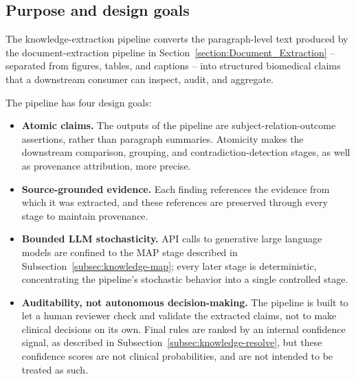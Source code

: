 \subsection{Purpose and design goals}\label{subsec:knowledge-pipeline-purpose}

The knowledge-extraction pipeline converts the paragraph-level text produced by the document-extraction pipeline in Section~\ref{section:Document_Extraction} -- separated from figures, tables, and captions -- into structured biomedical claims that a downstream consumer can inspect, audit, and aggregate. 

\medskip{}

The pipeline has four design goals: 

\begin{itemize}[label={}, leftmargin=1.5em, itemsep=0.4em]

    \item \textbf{Atomic claims.} The outputs of the pipeline are subject-relation-outcome assertions, rather than paragraph summaries. Atomicity makes the downstream comparison, grouping, and contradiction-detection stages, as well as provenance attribution, more precise.
    
    \item \textbf{Source-grounded evidence.} Each finding references the evidence from which it was extracted, and these references are preserved through every stage to maintain provenance.
    
    \item \textbf{Bounded LLM stochasticity.} API calls to generative large language models are confined to the MAP stage described in Subsection~\ref{subsec:knowledge-map}; every later stage is deterministic, concentrating the pipeline's stochastic behavior into a single controlled stage.
    
    \item \textbf{Auditability, not autonomous decision-making.} The pipeline is built to let a human reviewer check and validate the extracted claims, not to make clinical decisions on its own. Final rules are ranked by an internal confidence signal, as described in Subsection~\ref{subsec:knowledge-resolve}, but these confidence scores are not clinical probabilities, and are not intended to be treated as such. 
    
\end{itemize}